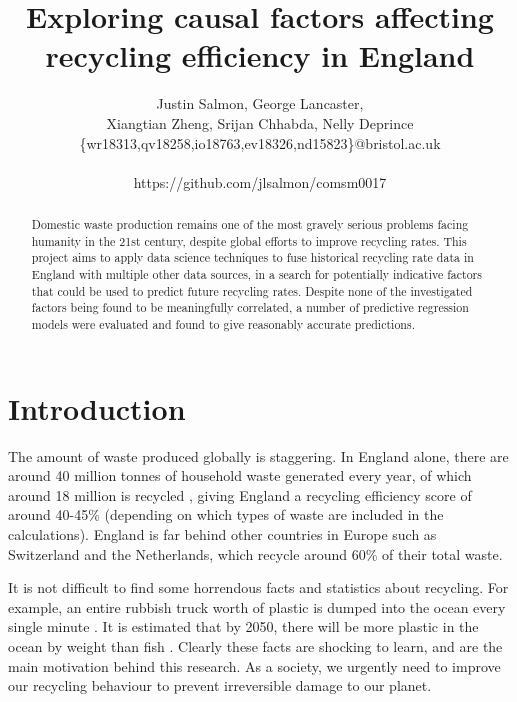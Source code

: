 \documentclass[11pt,conference]{IEEEtran}
\begin{document}
\addtolength{\dbltextfloatsep}{-0.12in}
\addtolength{\textfloatsep}{-0.12in}
\title{Exploring causal factors affecting recycling efficiency in England}
\author{
Justin Salmon, George Lancaster, \\Xiangtian Zheng, Srijan Chhabda, Nelly Deprince\\
{\normalsize \{wr18313,qv18258,io18763,ev18326,nd15823\}@bristol.ac.uk}\\
\\https://github.com/jlsalmon/comsm0017}
\maketitle
\begin{abstract}
Domestic waste production remains one of the most gravely serious problems facing humanity in the 21st century, despite global efforts to improve recycling rates. This project aims to apply data science techniques to fuse historical recycling rate data in England with multiple other data sources, in a search for potentially indicative factors that could be used to predict future recycling rates. Despite none of the investigated factors being found to be meaningfully correlated, a number of predictive regression models were evaluated and found to give reasonably accurate predictions.
\end{abstract}

\section{Introduction}
The amount of waste produced globally is staggering. In England alone, there are around 40 million tonnes of household waste generated every year, of which around 18 million is recycled \cite{Defra2019}, giving England a recycling efficiency score of around 40-45\% (depending on which types of waste are included in the calculations). England is far behind other countries in Europe such as Switzerland and the Netherlands, which recycle around 60\% of their total waste.

It is not difficult to find some horrendous facts and statistics about recycling. For example, an entire rubbish truck worth of plastic is dumped into the ocean every single minute \cite{Pennington2016}. It is estimated that by 2050, there will be more plastic in the ocean by weight than fish \cite{Connor2016}. Clearly these facts are shocking to learn, and are the main motivation behind this research. As a society, we urgently need to improve our recycling behaviour to prevent irreversible damage to our planet.
\end{document}
